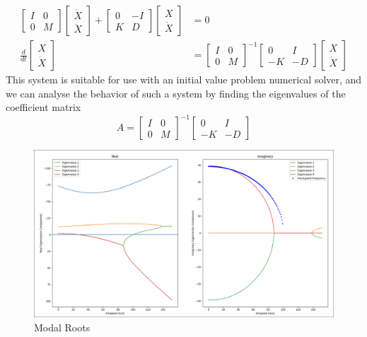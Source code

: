 \documentclass[11pt]{article}
\begin{document}
\begin{align*}
  \begin{bmatrix}
    I&0\\
    0&M
  \end{bmatrix}
  \begin{bmatrix}
    \dot{X}\\
    \ddot{X}
  \end{bmatrix}
  +
  \begin{bmatrix}
    0&-I\\
    K&D
  \end{bmatrix}
  \begin{bmatrix}
    X\\
    \dot{X}
  \end{bmatrix}
  &=0
  \\
  \frac{d}{dt}
  \begin{bmatrix}
    X\\
    \dot{X}
  \end{bmatrix}
  &=
  \begin{bmatrix}
    I&0\\
    0&M
  \end{bmatrix}^{-1}
  \begin{bmatrix}
    0&I\\
    -K&-D
  \end{bmatrix}
  \begin{bmatrix}
    X\\
    \dot{X}
  \end{bmatrix}
\end{align*}
This system is suitable for use with an initial value problem numerical solver, and we can analyse the behavior of such a system by finding the eigenvalues of the coefficient matrix
$$
  A = 
  \begin{bmatrix}
    I&0\\
    0&M
  \end{bmatrix}^{-1}
  \begin{bmatrix}
    0&I\\
    -K&-D
  \end{bmatrix}
$$
\begin{figure}[h!]
  \centering
  \includegraphics[width=170mm, trim=3 3 3 3, clip]{modal_roots.png}
  \caption{Modal Roots}\label{fig:modal_roots}
\end{figure}
\end{document}
